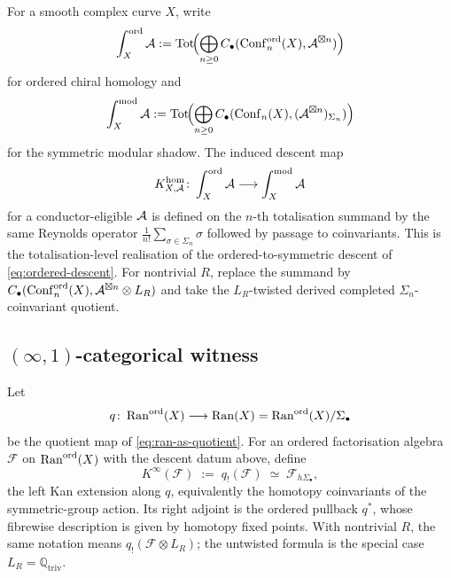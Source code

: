 \begin{definition}
\label{def:uc-totalization}
For a smooth complex curve $X$, write
\[
 \int_X^{\mathrm{ord}}\mathcal{A}
 :=
 \operatorname{Tot}\!\Bigl(\bigoplus_{n\geq 0}
 C_\bullet(\operatorname{Conf}_n^{\mathrm{ord}}(X),\mathcal{A}^{\boxtimes n})\Bigr)
\]
for ordered chiral homology and
\[
 \int_X^{\mathrm{mod}}\mathcal{A}
 :=
 \operatorname{Tot}\!\Bigl(\bigoplus_{n\geq 0}
 C_\bullet(\operatorname{Conf}_n(X),(\mathcal{A}^{\boxtimes n})_{\Sigma_n})\Bigr)
\]
for the symmetric modular shadow. The induced descent map
\[
 K^{\mathrm{hom}}_{X,\mathcal{A}}\colon
 \int_X^{\mathrm{ord}}\mathcal{A}\longrightarrow\int_X^{\mathrm{mod}}\mathcal{A}
\]
for a conductor-eligible $\mathcal{A}$ is defined on the $n$-th
totalisation summand by the same Reynolds
operator
$\frac{1}{n!}\sum_{\sigma\in\Sigma_n}\sigma$ followed by passage to
coinvariants. This is the totalisation-level realisation of the
ordered-to-symmetric descent of
\eqref{eq:ordered-descent}.
For nontrivial $R$, replace the summand by
$C_\bullet(\operatorname{Conf}_n^{\mathrm{ord}}(X),\mathcal{A}^{\boxtimes n}\otimes L_R)$ and take
the $L_R$-twisted derived completed $\Sigma_n$-coinvariant quotient.
\end{definition}

\subsection{$(\infty,1)$-categorical witness}
\label{subsec:uc-infinity-level}

\begin{definition}
\label{def:uc-homotopy-coinvariants}
Let
\[
 q\colon \operatorname{Ran}^{\mathrm{ord}}(X)\longrightarrow \operatorname{Ran}(X)=\operatorname{Ran}^{\mathrm{ord}}(X)/\Sigma_\bullet
\]
be the quotient map of \eqref{eq:ran-as-quotient}. For an ordered
factorisation algebra $\mathcal F$ on $\operatorname{Ran}^{\mathrm{ord}}(X)$ with the descent
datum above, define
\[
 K^\infty(\mathcal F)
 \;:=\;
 q_!(\mathcal F)
 \;\simeq\;
 \mathcal F_{h\Sigma_\bullet},
\]
the left Kan extension along $q$, equivalently the homotopy
coinvariants of the symmetric-group action. Its right adjoint is the
ordered pullback $q^*$, whose fibrewise description is given by
homotopy fixed points.
With nontrivial $R$, the same notation means
$q_!(\mathcal F\otimes L_R)$; the untwisted formula is the special case
$L_R=\mathbb Q_{\mathrm{triv}}$.
\end{definition}

